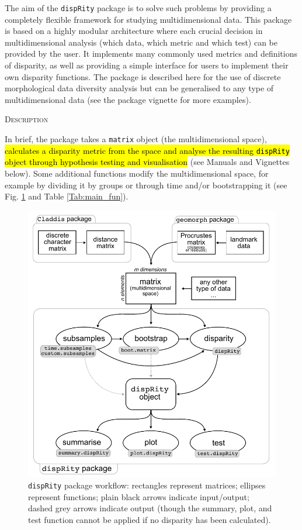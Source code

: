 \documentclass[12pt,letterpaper]{article}
\renewcommand{\section}[1]{%
\bigskip
\begin{center}
\begin{Large}
\normalfont\scshape #1
\medskip
\end{Large}
\end{center}}
\newcommand{\disp}{\texttt{dispRity} }
\begin{document}
The aim of the \disp package is to solve such problems by providing a completely flexible framework for studying multidimensional data.
This package is based on a highly modular architecture where each crucial decision in multidimensional analysis (which data, which metric and which test) can be provided by the user.
It implements many commonly used metrics and definitions of disparity, as well as providing a simple interface for users to implement their own disparity functions.
The package is described here for the use of discrete morphological data diversity analysis but can be generalised to any type of multidimensional data (see the package vignette for more examples).

\section{Description}
In brief, the package takes a \texttt{matrix} object (the multidimensional space), 
\hl{calculates a disparity metric from the space and analyse the resulting \texttt{dispRity} object through hypothesis testing and visualisation}
(see Manuals and Vignettes below).
Some additional functions modify the multidimensional space, for example by dividing it by groups or through time and/or bootstrapping it (see Fig. \ref{Fig:workflow} and Table \ref{Tab:main_fun}).

\begin{figure}[!htbp]
\centering
   \includegraphics[width=1\textwidth]{workflowsvg.pdf} 
\caption{\disp package workflow: rectangles represent matrices; ellipses represent functions; plain black arrows indicate input/output; dashed grey arrows indicate output (though the summary, plot, and test function cannot be applied if no disparity has been calculated).}
\label{Fig:workflow}
\end{figure}
\end{document}
